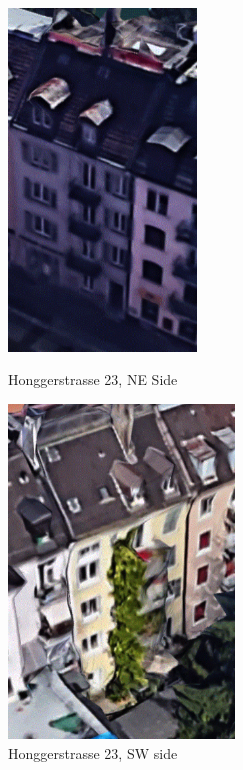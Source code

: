 \documentclass[11pt, a4paper]{article}
\theoremstyle{definition}
\begin{document}
		\begin{figure}[htbp]
		\centering
		\begin{minipage}[t]{0.48\textwidth}
		\centering
		\includegraphics[width=5cm]{Hongg_photo1.pdf}
		\caption{Honggerstrasse 23, NE Side}
		\label{fig:hongg_NE}
		\end{minipage}
		\begin{minipage}[t]{0.48\textwidth}
		\centering
		\includegraphics[width=6cm]{Hongg_photo0.pdf}
		\caption{Honggerstrasse 23, SW side}
		\label{fig:hongg_SW}
		\end{minipage}
		\end{figure}
\end{document}

